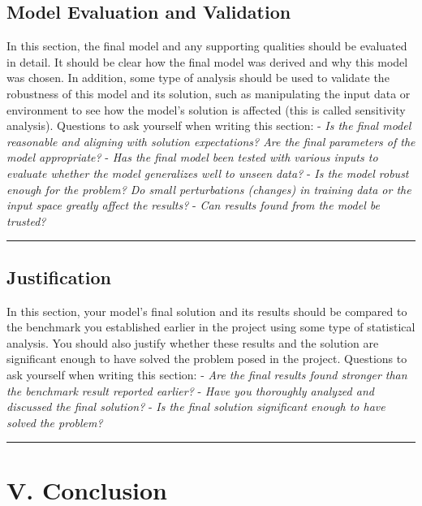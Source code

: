 \documentclass[12pt]{article}
\begin{document}
\subsection{Model Evaluation and Validation}\label{model-evaluation-and-validation}

In this section, the final model and any supporting qualities should be
evaluated in detail. It should be clear how the final model was derived
and why this model was chosen. In addition, some type of analysis should
be used to validate the robustness of this model and its solution, such
as manipulating the input data or environment to see how the model's
solution is affected (this is called sensitivity analysis). Questions to
ask yourself when writing this section: - \emph{Is the final model
reasonable and aligning with solution expectations? Are the final
parameters of the model appropriate?} - \emph{Has the final model been
tested with various inputs to evaluate whether the model generalizes
well to unseen data?} - \emph{Is the model robust enough for the
problem? Do small perturbations (changes) in training data or the input
space greatly affect the results?} - \emph{Can results found from the
model be trusted?}

\begin{center}\rule{0.5\linewidth}{\linethickness}\end{center}

\subsection{Justification}\label{justification}

In this section, your model's final solution and its results should be
compared to the benchmark you established earlier in the project using
some type of statistical analysis. You should also justify whether these
results and the solution are significant enough to have solved the
problem posed in the project. Questions to ask yourself when writing
this section: - \emph{Are the final results found stronger than the
benchmark result reported earlier?} - \emph{Have you thoroughly analyzed
and discussed the final solution?} - \emph{Is the final solution
significant enough to have solved the problem?}

\begin{center}\rule{0.5\linewidth}{\linethickness}\end{center}

\section{V. Conclusion}\label{v.-conclusion}
\end{document}
